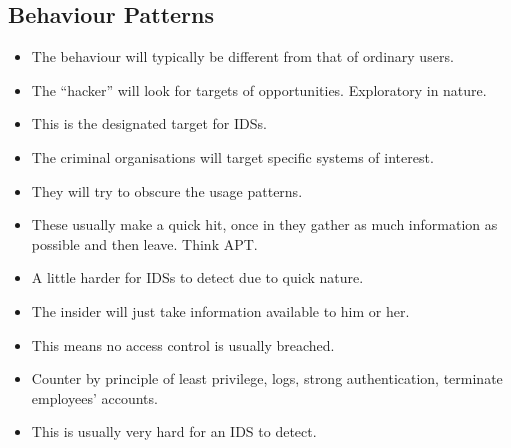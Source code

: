 \subsection{Behaviour Patterns}

\begin{frame}
  \begin{itemize}
    \item The behaviour will typically be different from that of ordinary 
      users.

    \item The ``hacker'' will look for targets of opportunities.
      Exploratory in nature.

    \item This is the designated target for IDSs.
  \end{itemize}
\end{frame}

\begin{frame}
  \begin{itemize}
    \item The criminal organisations will target specific systems of interest.

    \item They will try to obscure the usage patterns.

    \item These usually make a quick hit, once in they gather as much 
      information as possible and then leave.
      Think APT.

    \item A little harder for IDSs to detect due to quick nature.
  \end{itemize}
\end{frame}

\begin{frame}
  \begin{itemize}
    \item The insider will just take information available to him or her.

    \item This means no access control is usually breached.

    \item Counter by principle of least privilege, logs, strong authentication, 
      terminate employees' accounts.

    \item This is usually very hard for an IDS to detect.
  \end{itemize}
\end{frame}

